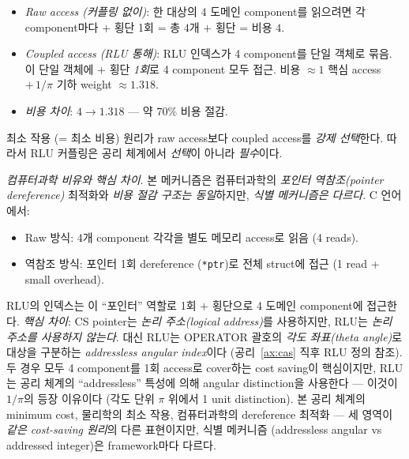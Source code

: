 \documentclass[entropy,article,submit,pdftex,oneauthor]{Definitions/mdpi}
\begin{document}
\begin{itemize}
\item \emph{Raw access (커플링 없이)}: 한 대상의 4 도메인 component를 읽으려면 각 component마다 $+$ 횡단 1회 = 총 $4$개 $+$ 횡단 = 비용 $4$.
\item \emph{Coupled access (RLU 통해)}: RLU 인덱스가 4 component를 단일 객체로 묶음. 이 단일 객체에 $+$ 횡단 \emph{1회}로 4 component 모두 접근. 비용 $\approx 1$ 핵심 access $+ \, 1/\pi$ 기하 weight $\approx 1.318$.
\item \emph{비용 차이}: $4 \to 1.318$ — 약 $70\%$ 비용 절감.
\end{itemize}

최소 작용 (= 최소 비용) 원리가 raw access보다 coupled access를 \emph{강제 선택}한다. 따라서 RLU 커플링은 공리 체계에서 \emph{선택}이 아니라 \emph{필수}이다.

\emph{컴퓨터과학 비유와 핵심 차이}. 본 메커니즘은 컴퓨터과학의 \emph{포인터 역참조(pointer dereference)} 최적화와 \emph{비용 절감 구조는 동일}하지만, \emph{식별 메커니즘은 다르다}. C 언어에서:
\begin{itemize}
\item Raw 방식: 4개 component 각각을 별도 메모리 access로 읽음 (4 reads).
\item 역참조 방식: 포인터 1회 dereference (\texttt{*ptr})로 전체 struct에 접근 (1 read + small overhead).
\end{itemize}
RLU의 인덱스는 이 ``포인터'' 역할로 1회 $+$ 횡단으로 4 도메인 component에 접근한다. \emph{핵심 차이}: CS pointer는 \emph{논리 주소(logical address)}를 사용하지만, RLU는 \emph{논리 주소를 사용하지 않는다}. 대신 RLU는 OPERATOR 괄호의 \emph{각도 좌표(theta angle)}로 대상을 구분하는 \emph{addressless angular index}이다 (공리~\ref{ax:cas} 직후 RLU 정의 참조). 두 경우 모두 4 component를 1회 access로 cover하는 cost saving이 핵심이지만, RLU는 공리 체계의 ``addressless'' 특성에 의해 angular distinction을 사용한다 — 이것이 $1/\pi$의 등장 이유이다 (각도 단위 $\pi$ 위에서 1 unit distinction). 본 공리 체계의 minimum cost, 물리학의 최소 작용, 컴퓨터과학의 dereference 최적화 — 세 영역이 \emph{같은 cost-saving 원리}의 다른 표현이지만, 식별 메커니즘 (addressless angular vs addressed integer)은 framework마다 다르다.
\end{document}
